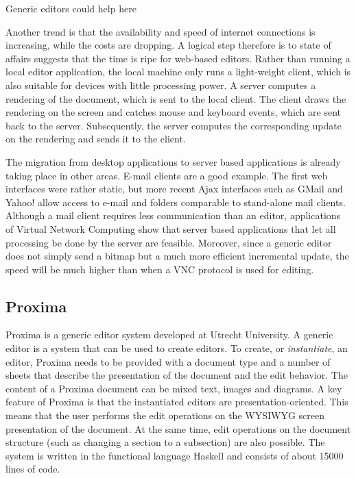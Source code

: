 \documentclass[10pt]{article}
\begin{document}
Generic editors could help here

Another trend is that the availability and speed of internet connections is increasing, while the costs are dropping. A logical step therefore is to state of affairs suggests that the time is ripe for web-based editors. Rather than running a local editor application, the local machine only runs a light-weight client, which is also suitable for devices with little processing power. A server computes a rendering of the document, which is sent to the local client. The client draws the rendering on the screen and catches mouse and keyboard events, which are sent back to the server. Subsequently, the server computes the corresponding update on the rendering and sends it to the client.

The migration from desktop applications to server based applications is already taking place in other areas. E-mail clients are a good example. The first web interfaces were rather static, but more recent Ajax interfaces such as GMail and Yahoo! allow access to e-mail and folders comparable to stand-alone mail clients. Although a mail client requires less communication than an editor, applications of Virtual Network Computing show that server based applications that let all processing be done by the server are feasible. Moreover, since a generic editor does not simply send a bitmap but a much more efficient incremental update, the speed will be much higher than when a VNC protocol is used for editing. 
\ec

\subsection{Proxima}

Proxima is a generic editor system developed at Utrecht University. A generic editor is a system that can be used to create editors. To create, or {\em instantiate}, an editor, Proxima needs to be provided with a document type and a number of sheets that describe the presentation of the document and the edit behavior. The content of a Proxima document can be mixed text, images and diagrams. A key feature of Proxima is that the instantiated editors are presentation-oriented. This means that the user performs the edit operations on the WYSIWYG screen presentation of the document. At the same time, edit operations on the document structure (such as changing a section to a subsection) are also possible. The system is written in the functional language Haskell and consists of about 15000 lines of code.
\end{document}
